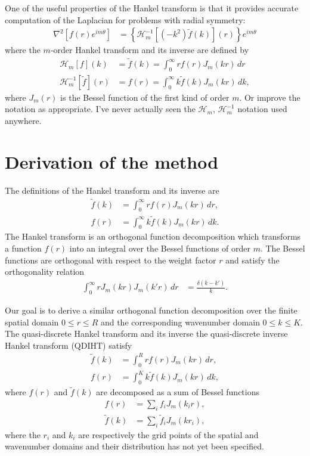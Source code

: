 \documentclass[aip,amsmath,amssymb,reprint,twocolumn]{revtex4-1}
\begin{document}
One of the useful properties of the Hankel transform is that it provides accurate computation of the Laplacian for problems with radial symmetry:
\begin{align}
  \nabla^2 \left[f(r) e^{i m \theta}\right] &= \left\{\mathcal{H}^{-1}_m\left[(-k^2)\tilde{f}(k)\right](r)\right\}e^{i m \theta}
\end{align}
where the $m$-order Hankel transform and its inverse are defined by
\begin{align}
  \mathcal{H}_m[f](k) &= \tilde{f}(k) = \int_0^{\infty} r f(r) J_m(k r) \, dr \\
  \mathcal{H}^{-1}_m[\tilde{f}](r) &= f(r) = \int_0^{\infty} k \tilde{f}(k) J_m(k r)\, dk,
\end{align}
where $J_m(r)$ is the Bessel function of the first kind of order $m$. Or improve the notation as appropriate.  I've never actually seen the $\mathcal{H}_m$, $\mathcal{H}^{-1}_m$ notation used anywhere.

\section{Derivation of the method}
\label{sec:Derivation}

The definitions of the Hankel transform and its inverse are
\begin{align}
  \tilde{f}(k) &= \int_0^\infty r f(r) J_{m}(k r)\, dr, \\
  f(r) &= \int_0^\infty k \tilde{f}(k) J_{m}(k r)\, dk. 
\end{align}
The Hankel transform is an orthogonal function decomposition which transforms a function $f(r)$ into an integral over the Bessel functions of order $m$. The Bessel functions are orthogonal with respect to the weight factor $r$ and satisfy the orthogonality relation
\begin{align}
  \int_0^\infty r J_m(k r) J_m(k' r) \,dr &= \frac{\delta(k - k')}{k}.
\end{align}

Our goal is to derive a similar orthogonal function decomposition over the finite spatial domain $0 \leq r \leq R$ and the corresponding wavenumber domain $0 \leq k \leq K$.  The quasi-discrete Hankel transform and its inverse the quasi-discrete inverse Hankel transform (QDIHT) satisfy
\begin{align}
  \tilde{f}(k) &= \int_0^R r f(r) J_{m}(k r)\, dr,  \label{eq:QDHT} \\
  f(r) &= \int_0^K k \tilde{f}(k) J_{m}(k r)\, dk,  \label{eq:QDIHT}
\end{align}
where $f(r)$ and $\tilde{f}(k)$ are decomposed as a sum of Bessel functions
\begin{align}
  f(r) &= \sum_i f_i J_m(k_i r),  \label{eq:RDecomposition} \\
  \tilde{f}(k) &= \sum_i \tilde{f}_i J_m(k r_i), \label{eq:KDecomposition}
\end{align}
where the $r_i$ and $k_i$ are respectively the grid points of the spatial and wavenumber domains and their distribution has not yet been specified.
\end{document}
